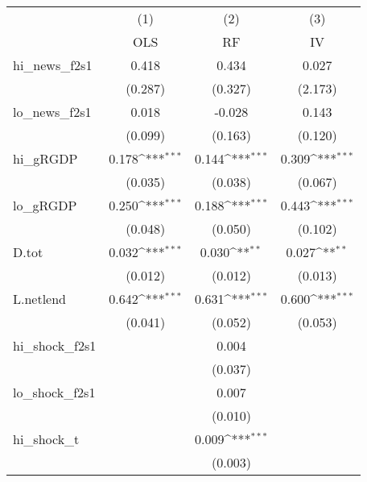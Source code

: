 {
\def\sym#1{\ifmmode^{#1}\else\(^{#1}\)\fi}
\begin{tabular}{l*{3}{c}}
\toprule
            &\multicolumn{1}{c}{(1)}&\multicolumn{1}{c}{(2)}&\multicolumn{1}{c}{(3)}\\
            &\multicolumn{1}{c}{OLS}&\multicolumn{1}{c}{RF}&\multicolumn{1}{c}{IV}\\
\midrule
hi\_news\_f2s1&       0.418         &       0.434         &       0.027         \\
            &     (0.287)         &     (0.327)         &     (2.173)         \\
\addlinespace
lo\_news\_f2s1&       0.018         &      -0.028         &       0.143         \\
            &     (0.099)         &     (0.163)         &     (0.120)         \\
\addlinespace
hi\_gRGDP    &       0.178\sym{***}&       0.144\sym{***}&       0.309\sym{***}\\
            &     (0.035)         &     (0.038)         &     (0.067)         \\
\addlinespace
lo\_gRGDP    &       0.250\sym{***}&       0.188\sym{***}&       0.443\sym{***}\\
            &     (0.048)         &     (0.050)         &     (0.102)         \\
\addlinespace
D.tot       &       0.032\sym{***}&       0.030\sym{**} &       0.027\sym{**} \\
            &     (0.012)         &     (0.012)         &     (0.013)         \\
\addlinespace
L.netlend   &       0.642\sym{***}&       0.631\sym{***}&       0.600\sym{***}\\
            &     (0.041)         &     (0.052)         &     (0.053)         \\
\addlinespace
hi\_shock\_f2s1&                     &       0.004         &                     \\
            &                     &     (0.037)         &                     \\
\addlinespace
lo\_shock\_f2s1&                     &       0.007         &                     \\
            &                     &     (0.010)         &                     \\
\addlinespace
hi\_shock\_t  &                     &       0.009\sym{***}&                     \\
            &                     &     (0.003)         &                     \\

\end{tabular}}
